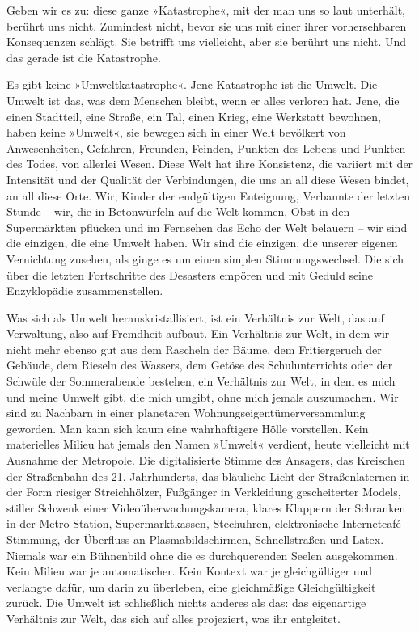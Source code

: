 Geben wir es zu: diese ganze »Katastrophe«, mit der man uns so laut
unterhält, berührt uns nicht. Zumindest nicht, bevor sie uns mit
einer ihrer vorhersehbaren Konsequenzen schlägt. Sie betrifft uns
vielleicht, aber sie berührt uns nicht. Und das gerade ist die
Katastrophe.

Es gibt keine »Umweltkatastrophe«. Jene Katastrophe ist die Umwelt.
Die Umwelt ist das, was dem Menschen bleibt, wenn er alles verloren
hat. Jene, die einen Stadtteil, eine Straße, ein Tal, einen Krieg,
eine Werkstatt bewohnen, haben keine »Umwelt«, sie bewegen sich in
einer Welt bevölkert von Anwesenheiten, Gefahren, Freunden,
Feinden, Punkten des Lebens und Punkten des Todes, von allerlei
Wesen. Diese Welt hat ihre Konsistenz, die variiert mit der
Intensität und der Qualität der Verbindungen, die uns an all diese
Wesen bindet, an all diese Orte. Wir, Kinder der endgültigen
Enteignung, Verbannte der letzten Stunde – wir, die in Betonwürfeln
auf die Welt kommen, Obst in den Supermärkten pflücken und im
Fernsehen das Echo der Welt belauern – wir sind die einzigen, die
eine Umwelt haben. Wir sind die einzigen, die unserer eigenen
Vernichtung zusehen, als ginge es um einen simplen
Stimmungswechsel. Die sich über die letzten Fortschritte des
Desasters empören und mit Geduld seine Enzyklopädie
zusammenstellen.

\extrapar{}

Was sich als Umwelt herauskristallisiert, ist ein Verhältnis zur
Welt, das auf Verwaltung, also auf Fremdheit aufbaut. Ein
Verhältnis zur Welt, in dem wir nicht mehr ebenso gut aus dem
Rascheln der Bäume, dem Fritiergeruch der Gebäude, dem Rieseln des
Wassers, dem Getöse des Schulunterrichts oder der Schwüle der
Sommerabende bestehen, ein Verhältnis zur Welt, in dem es mich und
meine Umwelt gibt, die mich umgibt, ohne mich jemals auszumachen.
Wir sind zu Nachbarn in einer planetaren
Wohnungseigentümerversammlung geworden. Man kann sich kaum eine
wahrhaftigere Hölle vorstellen. Kein materielles Milieu hat jemals
den Namen »Umwelt« verdient, heute vielleicht mit Ausnahme der
Metropole. Die digitalisierte Stimme des Ansagers, das Kreischen
der Straßenbahn des 21. Jahrhunderts, das bläuliche Licht der
Straßenlaternen in der Form riesiger Streichhölzer, Fußgänger in
Verkleidung gescheiterter Models, stiller Schwenk einer
Videoüberwachungskamera, klares Klappern der Schranken in der
Metro-Station, Supermarktkassen, Stechuhren, elektronische
Internetcafé-Stimmung, der Überfluss an Plasmabildschirmen,
Schnellstraßen und Latex. Niemals war ein Bühnenbild ohne die es
durchquerenden Seelen ausgekommen. Kein Milieu war je
automatischer. Kein Kontext war je gleichgültiger und verlangte
dafür, um darin zu überleben, eine gleichmäßige Gleichgültigkeit
zurück. Die Umwelt ist schließlich nichts anderes als das: das
eigenartige Verhältnis zur Welt, das sich auf alles projeziert, was
ihr entgleitet.
\extrapar{}

